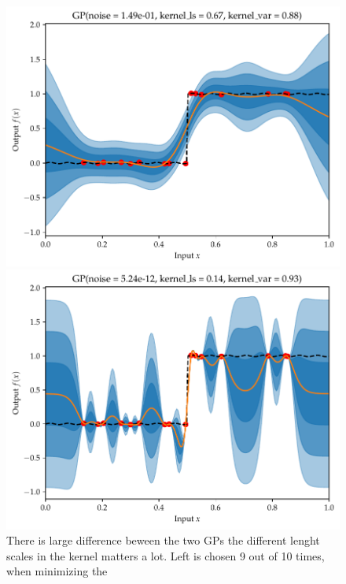 \begin{figure}[H]
    \centering
    \begin{minipage}[b]{0.49\textwidth}
     \includegraphics[width=\textwidth]{Pictures/GP_vs_BNN1.pdf}
    \end{minipage}
    \hfill
    \begin{minipage}[b]{0.49\textwidth}
      \includegraphics[width=\textwidth]{Pictures/GP_vs_BNN1_b.pdf}
     \end{minipage}
     \caption{There is large difference beween the two GPs the different lenght scales in the kernel
     matters a lot. Left is chosen 9 out of 10 times, when minimizing the }
\end{figure}


